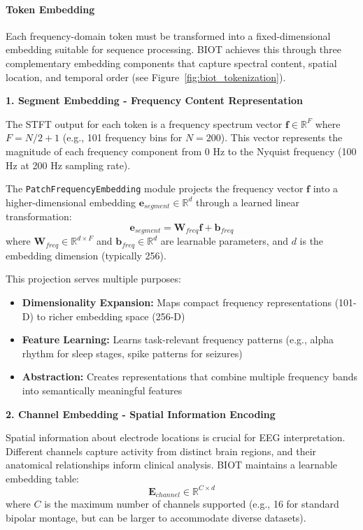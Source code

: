 \paragraph{Token Embedding}
Each frequency-domain token must be transformed into a fixed-dimensional embedding suitable for sequence processing. \ac{BIOT} achieves this through three complementary embedding components that capture spectral content, spatial location, and temporal order (see Figure~\ref{fig:biot_tokenization}).

\textbf{1. Segment Embedding - Frequency Content Representation}

The \ac{STFT} output for each token is a frequency spectrum vector $\mathbf{f} \in \mathbb{R}^{F}$ where $F = N/2 + 1$ (e.g., 101 frequency bins for $N=200$). This vector represents the magnitude of each frequency component from 0 Hz to the Nyquist frequency (100 Hz at 200 Hz sampling rate).

The \texttt{PatchFrequencyEmbedding} module projects the frequency vector $\mathbf{f}$ into a higher-dimensional embedding $\mathbf{e}_{segment} \in \mathbb{R}^{d}$ through a learned linear transformation:
$$\mathbf{e}_{segment} = \mathbf{W}_{freq} \mathbf{f} + \mathbf{b}_{freq}$$
where $\mathbf{W}_{freq} \in \mathbb{R}^{d \times F}$ and $\mathbf{b}_{freq} \in \mathbb{R}^{d}$ are learnable parameters, and $d$ is the embedding dimension (typically 256).

This projection serves multiple purposes:
\begin{itemize}
    \item \textbf{Dimensionality Expansion:} Maps compact frequency representations (101-D) to richer embedding space (256-D)
    \item \textbf{Feature Learning:} Learns task-relevant frequency patterns (e.g., alpha rhythm for sleep stages, spike patterns for seizures)
    \item \textbf{Abstraction:} Creates representations that combine multiple frequency bands into semantically meaningful features
\end{itemize}

\textbf{2. Channel Embedding - Spatial Information Encoding}

Spatial information about electrode locations is crucial for \ac{EEG} interpretation. Different channels capture activity from distinct brain regions, and their anatomical relationships inform clinical analysis. \ac{BIOT} maintains a learnable embedding table:
$$\mathbf{E}_{channel} \in \mathbb{R}^{C \times d}$$
where $C$ is the maximum number of channels supported (e.g., 16 for standard bipolar montage, but can be larger to accommodate diverse datasets).

